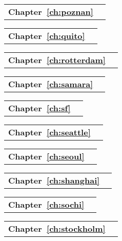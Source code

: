\begin{tabular}[width=0.48\textwidth]{@{}l l}
\textbf{Chapter~\ref{ch:poznan}} &  \\
\end{tabular}

\begin{tabular}[width=0.48\textwidth]{@{}l l}
\textbf{Chapter~\ref{ch:quito}} &  \\
\end{tabular}

\begin{tabular}[width=0.48\textwidth]{@{}l l}
\textbf{Chapter~\ref{ch:rotterdam}} &  \\
\end{tabular}

\begin{tabular}[width=0.48\textwidth]{@{}l l}
\textbf{Chapter~\ref{ch:samara}} &  \\
\end{tabular}

\begin{tabular}[width=0.48\textwidth]{@{}l l}
\textbf{Chapter~\ref{ch:sf}} &  \\
\end{tabular}

\begin{tabular}[width=0.48\textwidth]{@{}l l}
\textbf{Chapter~\ref{ch:seattle}} &  \\
\end{tabular}

\begin{tabular}[width=0.48\textwidth]{@{}l l}
\textbf{Chapter~\ref{ch:seoul}} &  \\
\end{tabular}

\begin{tabular}[width=0.48\textwidth]{@{}l l}
\textbf{Chapter~\ref{ch:shanghai}} &  \\
\end{tabular}

\begin{tabular}[width=0.48\textwidth]{@{}l l}
\textbf{Chapter~\ref{ch:sochi}} &  \\
\end{tabular}

\begin{tabular}[width=0.48\textwidth]{@{}l l}
\textbf{Chapter~\ref{ch:stockholm}} &  \\
\end{tabular}

